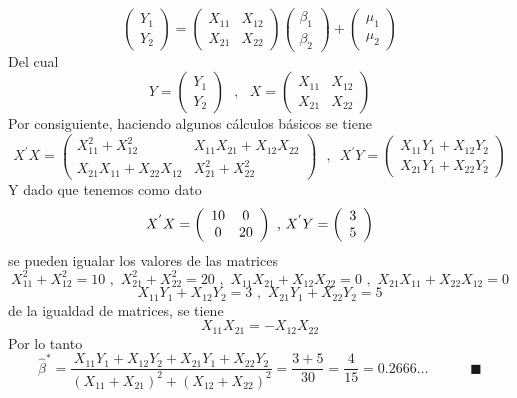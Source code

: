 \documentclass[10pt,a4paper, openany ]{book}
\begin{document}
  \[
  \left(\begin{array}{cccc}
      Y_{1}  \\
      Y_{2} 
  \end{array}\right) =\left(\begin{array}{cccc}
      X_{11}  & X_{12} \\
      X_{21}  & X_{22} 
  \end{array}\right) \left(\begin{array}{cccc}
      \beta_{1} \\
      \beta_{2} 
  \end{array}\right) +  \left(\begin{array}{cccc}
      \mu_{1} \\
      \mu_{2} 
  \end{array}\right)
  \]
  Del cual 
  \[
  Y = \left( \begin{array}{cccc}
        Y_{1} \\
        Y_{2}
  \end{array}  \right) \, \, \, \, ,  \, \, \, \, X = \left( \begin{array}{cccc}
      X_{11}  & X_{12} \\
      X_{21}  & X_{22} 
  \end{array}\right) 
  \]
  Por consiguiente, haciendo algunos cálculos básicos se tiene 
  \[
  X^{'}X = \left( \begin{array}{cccc}
        X_{11}^{2}+X_{12}^{2} & X_{11}X_{21}+X_{12}X_{22} \\
        X_{21}X_{11}+X_{22}X_{12} & X_{21}^{2}+X_{22}^{2} 
  \end{array}  \right)      \, \, \, \, , \, \, \, X^{'}Y = \left( \begin{array}{cccc}
        X_{11}Y_{1} + X_{12}Y_{2} \\
        X_{21}Y_{1} + X_{22}Y_{2}
  \end{array}  \right) 
  \]
  Y dado que tenemos como dato
  \[
    X^{'}X = \left (\begin{array}{cccc}
        10 & 0 \\
        0  & 20
    \end{array}\right) \, \, \textup{,} \, \, X^{'}Y = \left(\begin{array}{cccc}
          3 \\
          5 
    \end{array} \right)
    \]
  se pueden igualar los valores de las matrices
  \[
  X_{11}^{2}+X_{12}^{2} = 10 \, \, , \, \, X_{21}^{2}+X_{22}^{2} = 20 \, \, , \, \,X_{11}X_{21}+X_{12}X_{22} = 0  \, \, , \, \, X_{21}X_{11}+X_{22}X_{12}  = 0 
  \]
  \[
  X_{11}Y_{1} + X_{12}Y_{2}  = 3  \, \, , \, \,  X_{21}Y_{1} + X_{22}Y_{2} = 5
  \]
  de la igualdad de matrices, se tiene 
  \[
  X_{11}X_{21} = - X_{12}X_{22}
  \]
  Por lo tanto
  \[
  \hat{\beta}^{*} = \dfrac{X_{11}Y_{1}+X_{12}Y_{2}+X_{21}Y_{1}+X_{22}Y_{2}}{\left(X_{11}+X_{21}\right)^{2} + \left(X_{12}+X_{22}\right)^{2}} = \dfrac{3+5}{30} = \dfrac{4}{15} = 0.2666\dots \, \, \, \, \, \, \, \, \, \, \, \, \, \, \, \, \, \,    \blacksquare
  \]
\end{document}
